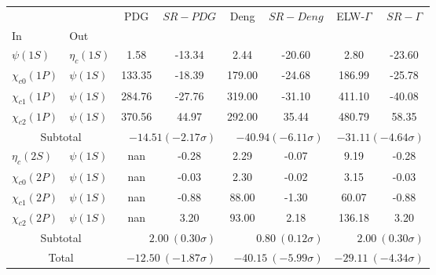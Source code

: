\begin{tabular}{|l|l|c|c|c|c|c|c|}%
\hline%
&&PDG&$SR-PDG$&Deng&$SR-Deng$&ELW-$\Gamma$&$SR-\Gamma$\\%
In&Out&&&&&&\\%
\hline%
$\psi(1S)$&$\eta_{c}(1S)$&1.58&-13.34&2.44&-20.60&2.80&-23.60\\%
$\chi_{c0}(1P)$&$\psi(1S)$&133.35&-18.39&179.00&-24.68&186.99&-25.78\\%
$\chi_{c1}(1P)$&$\psi(1S)$&284.76&-27.76&319.00&-31.10&411.10&-40.08\\%
$\chi_{c2}(1P)$&$\psi(1S)$&370.56&44.97&292.00&35.44&480.79&58.35\\%
\hline%
\hline%
\multicolumn{2}{|c|}{Subtotal}&\multicolumn{2}{|r|}{$-14.51 (-2.17\sigma)$}&\multicolumn{2}{|r|}{$-40.94 (-6.11\sigma)$}&\multicolumn{2}{|r|}{$-31.11 (-4.64\sigma)$}\\%
\hline%
\hline%
$\eta_{c}(2S)$&$\psi(1S)$&nan&-0.28&2.29&-0.07&9.19&-0.28\\%
$\chi_{c0}(2P)$&$\psi(1S)$&nan&-0.03&2.30&-0.02&3.15&-0.03\\%
$\chi_{c1}(2P)$&$\psi(1S)$&nan&-0.88&88.00&-1.30&60.07&-0.88\\%
$\chi_{c2}(2P)$&$\psi(1S)$&nan&3.20&93.00&2.18&136.18&3.20\\%
\hline%
\hline%
\multicolumn{2}{|c|}{Subtotal}&\multicolumn{2}{|r|}{$2.00~(0.30\sigma)$}&\multicolumn{2}{|r|}{$0.80~(0.12\sigma)$}&\multicolumn{2}{|r|}{$2.00~(0.30\sigma)$}\\%
\hline%
\hline%
\multicolumn{2}{|c|}{Total}&\multicolumn{2}{|r|}{$-12.50~(-1.87\sigma)$}&\multicolumn{2}{|r|}{$-40.15~(-5.99\sigma)$}&\multicolumn{2}{|r|}{$-29.11~(-4.34\sigma)$}\\%
\hline%
\end{tabular}